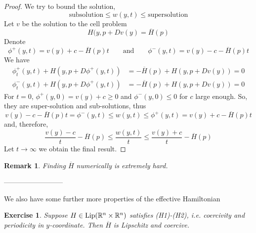 \documentclass[12pt, oneside]{amsart}  	%
\newtheorem{remark}{Remark}
\newtheorem{exercise}{Exercise}
\begin{document}
\begin{proof}
We try to bound the solution, 
$$\text{subsolution} \le w(y,t) \le \text{supersolution}$$
Let $v$ be the solution to the cell problem
$$H(y, p+ Dv(y) = \overline{H}(p)$$
Denote 
\begin{equation*}
\phi^+(y,t)=v(y) + c -\overline{H}(p)t\qquad\text{and}\qquad\phi^-(y,t)=v(y) - c -\overline{H}(p)t
\end{equation*}
We have
\begin{align*}
\phi^+_t(y,t) + H(y, p + D\phi^+(y,t))&= -\overline{H}(p) + H(y, p + Dv(y))=0\\
\phi^-_t(y,t) + H(y, p + D\phi^+(y,t))&= -\overline{H}(p) + H(y, p + Dv(y))=0
\end{align*}
For $t=0$, $\phi^+(y,0)=v(y)+c \ge 0$ and $\phi^-(y,0)\le 0$ for $c$ large enough. So, they are super-solution and sub-solutions, thus
$$v(y)-c-\overline{H}(p)t = \phi^-(y,t) \le w(y,t) \le \phi^+(y,t) = v(y) + c -\overline{H}(p)t$$
and, therefore,
$$\frac{v(y)-c}{t}-\overline{H}(p)\le \frac{w(y,t)}{t} \le\frac{v(y)+c}{t}-\overline{H}(p)$$
Let $t\longrightarrow \infty$ we obtain the final result.
\end{proof}
\begin{remark}
Finding $\overline{H}$ numerically is extremely hard.
\end{remark}
--------------------------

We also have some further more properties of the effective Hamiltonian

\begin{exercise} \label{exercise4}
Suppose $H\in\text{Lip}(\mathbb{R}^n\times\mathbb{R}^n)$ satisfies (H1)-(H2), i.e. coercivity and periodicity in $y$-coordinate. Then $\overline{H}$ is Lipschitz and coercive. 
\end{exercise}











\end{document}
